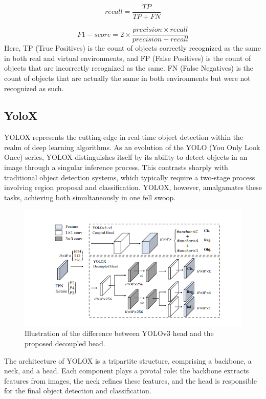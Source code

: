 \begin{equation}
  recall = \frac{TP}{TP + FN}
\end{equation}

\begin{equation}
  F1-score = 2 \times \frac{precision \times recall}{precision + recall}
\end{equation}
\singlespacing
Here, TP (True Positives) is the count of objects correctly recognized as the same in both real and virtual environments, and FP (False Positives) is the count of objects that are incorrectly recognized as the same. FN (False Negatives) is the count of objects that are actually the same in both environments but were not recognized as such.

\subsection{YoloX}
\label{sec:You Only Look Once(Yolo)X}
\singlespacing
YOLOX\cite{ge2021yolox} represents the cutting-edge in real-time object detection within the realm of deep learning algorithms. As an evolution of the YOLO (You Only Look Once) series, YOLOX distinguishes itself by its ability to detect objects in an image through a singular inference process. This contrasts sharply with traditional object detection systems, which typically require a two-stage process involving region proposal and classification. YOLOX, however, amalgamates these tasks, achieving both simultaneously in one fell swoop.
\singlespacing
\begin{figure}[htbp]
  \centering
  \includegraphics[scale=0.6]{./Figure/画像22.png}
  \caption{Illustration of the difference between YOLOv3 head and the proposed decoupled head.}
  \label{fig: Illustration of the difference between YOLOv3 head and the proposed decoupled head.}
\end{figure}
\singlespacing
The architecture of YOLOX is a tripartite structure, comprising a backbone, a neck, and a head. Each component plays a pivotal role: the backbone extracts features from images, the neck refines these features, and the head is responsible for the final object detection and classification.



